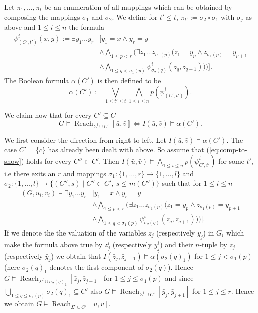 \documentclass{LMCS}
\DeclareMathOperator{\Reach}{Reach}
\begin{document}
Let $\pi_1, \ldots, \pi_t $ be an enumeration of all mappings which can be obtained by composing the mappings 
$\sigma_1$ and $ \sigma_2$. We define for $ t' \le t$, $\pi_{t'}:= \sigma_2 \circ \sigma_1$ with $\sigma_j$ as above 
and $1 \le i \le n$ the formula
\[
   \begin{array}{ll}
   \psi^i_{(C',t')}(x,y):=  \exists y_1 \ldots y_r & \Big[ y_1 = x \wedge y_r = y \\ 
    &\wedge \bigwedge_{1 \le p < r} \Big(\exists z_1 \ldots z_{\sigma_1(p)} \big( z_1 =y_p \wedge z_{\sigma_1(p)}=y_{p+1} \\ 
    & \wedge \bigwedge_{1 \le q < \sigma_1(p)} \psi^i_{\sigma_2(q)}(z_q,z_{q+1}) \big) \Big) \Big].
   \end{array}
\]
The Boolean formula $\alpha(C')$ is then defined to be 
\[\alpha(C'):= \bigvee_{1 \le t' \le t} \bigwedge_{1 \le i \le n} p(\psi^i_{(C',t')}).\]

We claim now that for every $C' \subseteq C$
\begin{equation}\label{eq:comp-to-show}
 G \models \Reach_{\Sigma^l \cup C'}[\bar u, \bar v] \Leftrightarrow I(\bar u,\bar v) \models \alpha(C').
\end{equation}

We first consider the direction from right to left. Let $I(\bar u,\bar v) \models \alpha(C')$.
The case $C'=\{\bar c\}$ has already been dealt with above. So assume that (\ref{eq:comp-to-show}) holds 
for every $C'' \subset C'$. Then $I(\bar u,\bar v) \models \bigwedge_{1 \le i \le n} p(\psi^i_{C',t'})$ for
some $t'$, i.e there exits an $r$ and mappings $\sigma_1: \{1, \ldots, r\} \rightarrow \{1, \ldots, l\}$
and $\sigma_2:  \{1, \ldots, l\} \rightarrow \{(C'',s) \mid C'' \subset C',\ s \le m(C'')\}$ such that
for $1 \le i \le n$
\[ 
\begin{array}{ll}
 (G,u_i,v_i) \models \exists y_1 \ldots y_r & \Big[ y_1 = x \wedge y_r = y \\ 
    & \wedge \bigwedge_{1 \le p < r} \Big( \exists z_1 \ldots z_{\sigma_1(p)} \big( z_1 =y_p \wedge z_{\sigma_1(p)}=y_{p+1} \\ 
    & \wedge \bigwedge_{1 \le q < \sigma_1(p)} \psi^i_{\sigma_2(q)}(z_q,z_{q+1}) \big) \Big) \Big].
\end{array}
\]
If we denote the the valuation of the variables $z_j$ (respectively $y_j$) in $G_i$ which make the formula above true by $z_j^i$ 
(respectively $y_j^i$) and their $n$-tuple by $\bar z_j$ (respectively $\bar y_j$) we obtain that 
$I(\bar z_j,\bar z_{j+1}) \models \alpha(\sigma_2(q)_1)$ for $1 \le j < \sigma_1(p)$ (here $\sigma_2(q)_1$ denotes the
first component of $\sigma_2(q)$). Hence
$G \models \Reach_{\Sigma^l \cup \sigma_2(q)_1}[\bar z_j, \bar z_{j+1}]$ for $1 \le j \le \sigma_1(p)$ and
since $\bigcup_{1 \le q \le \sigma_1(p)} \sigma_2(q)_1 \subseteq C'$
also $G \models \Reach_{\Sigma^l \cup C'}[\bar y_j, \bar y_{j+1}]$ for $1 \le j \le r$.
Hence we obtain $G \models \Reach_{\Sigma^l \cup C'}[\bar u, \bar v]$.
\end{document}
